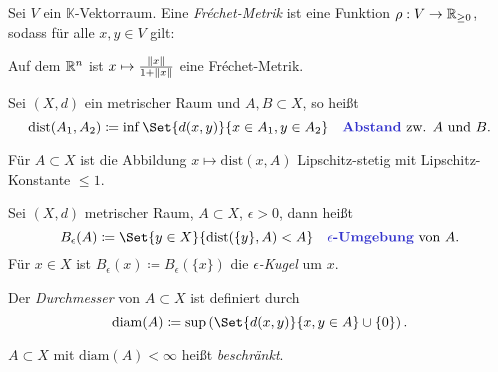 \documentclass{cheat-sheet}
\newcommand{\K}{\mathbb{K}}
\newcommand{\dist}{\mathrm{dist}} %
\newcommand{\diam}{\mathrm{diam}} %
\begin{document}

\begin{definition}
  Sei $V$ ein $\K$-Vektorraum. Eine \emph{Fréchet-Metrik} ist eine Funktion $\rho : V \to \mathbb{R}_{\geq 0}$, sodass für alle $x, y \in V$ gilt:
  \begin{itemize}
  \end{itemize}
\end{definition}

\begin{bsp}
  Auf dem $\mathbb{R}^n$ ist $x \mapsto \tfrac{\lVert x\rVert}{1 + \lVert x\rVert}$ eine Fréchet-Metrik.
\end{bsp}

\begin{definition}
  Sei $(X, d)$ ein metrischer Raum und $A, B \subset X$, so heißt
  \[ \dist(A_1, A_2) \coloneqq \inf \Set{ d(x,y) }{ x \in A_1, y \in A_2 } \quad \text{\emph{Abstand} zw. $A$ und $B$.} \]
\end{definition}


\begin{bem}
  Für $A \subset X$ ist die Abbildung $x \mapsto \dist(x, A)$ Lipschitz-stetig mit Lipschitz-Konstante $\leq 1$.
\end{bem}

\begin{definition}
  Sei $(X, d)$ metrischer Raum, $A \subset X$, $\epsilon > 0$, dann heißt
  \[ B_\epsilon(A) \coloneqq \Set{ y \in X }{ \dist(\{ y \}, A) < A} \quad \text{\emph{$\epsilon$-Umgebung} von $A$.} \]
  Für $x \in X$ ist $B_\epsilon(x) \coloneqq B_\epsilon(\{ x \})$ die \emph{$\epsilon$-Kugel} um $x$.
\end{definition}

\begin{definition}
  Der \emph{Durchmesser} von $A \subset X$ ist definiert durch
  \[ \diam(A) \coloneqq \sup \left( \Set{ d(x, y) }{ x, y \in A } \cup \{ 0 \} \right). \]
\end{definition}

\begin{definition}
  $A {\subset} X$ mit $\diam(A) < \infty$ heißt \emph{beschränkt}.
\end{definition}
\end{document}

